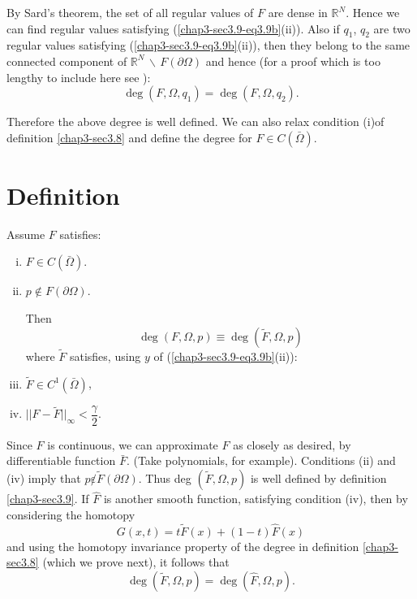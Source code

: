 By Sard's theorem, the set of all regular values of $F$ are dense in
$\mathbb{R}^N$. Hence we can find regular values satisfying
(\ref{chap3-sec3.9-eq3.9b}(ii)). 
Also if $q_1$, $q_2$ are two regular values satisfying
(\ref{chap3-sec3.9-eq3.9b}(ii)), then they belong to the same
connected component of 
$\mathbb{R}^N \, \backslash \,  F(\partial \Omega)$ and hence (for a
proof which is too lengthy to include here see \cite{key29}): 
$$
\deg (F, \Omega, q_1) = \deg (F, \Omega, q_2). 
$$

Therefore the above degree is well defined. We can also relax
condition (i)\pageoriginale of definition \ref{chap3-sec3.8} and
define the degree for $F \in C(\bar{\Omega})$.  


\section{Definition}\label{chap3-sec3.10}%
Assume $F$ satisfies:
\begin{enumerate}[(i)]
\item $ F \in C (\bar{\Omega})$.

\item $p \notin F (\partial \Omega)$.

Then 
\begin{equation*}
\deg (F, \Omega , p ) \equiv \deg (\tilde{F}, \Omega , p)
\tag{3.10}\label{chap3-sec3.10-eq3.10} 
\end{equation*}
where $\tilde{F}$ satisfies, using $y$ of (\ref{chap3-sec3.9-eq3.9b}(ii)):

\item $\tilde{F} \in C^1 (\bar{\Omega})$,

\item $|| F - \tilde{F}||_\infty < \dfrac{\gamma}{2}$. 
\end{enumerate}

Since $F$ is continuous, we can approximate $F$ as closely as desired,
by differentiable function $\bar{F}$. (Take polynomials, for
example). Conditions (ii) and (iv) imply that $p \not\varepsilon
\tilde{F} (\partial \Omega)$. Thus deg $(\tilde{F}, \Omega, p)$ is
well defined by definition \ref{chap3-sec3.9}. If $\hat{F}$ is another smooth
function, satisfying condition (iv), then by considering the
homotopy 
$$
G(x,t) = t \tilde{F}(x) + (1 - t) \hat{F}(x) 
$$ 
and using the homotopy invariance property of the degree in definition 
\ref{chap3-sec3.8} (which we prove next), it follows that 
$$
\deg (\tilde{F}, \Omega, p) = \deg (\hat{F}, \Omega, p). 
$$

